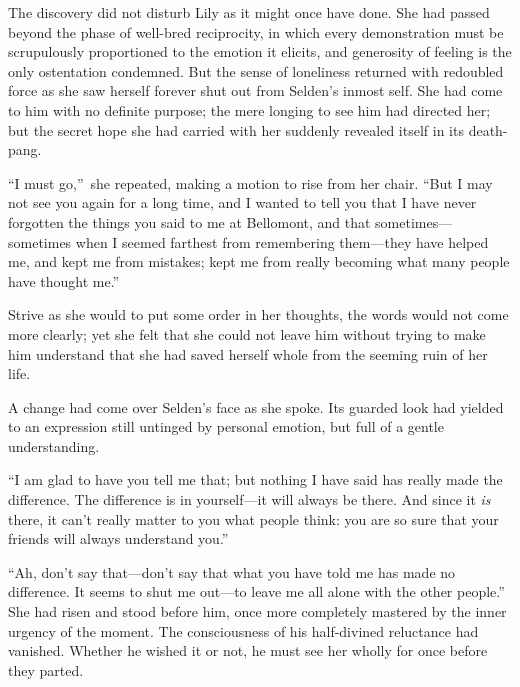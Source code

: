 \documentclass[12pt,a4paper]{book}
\begin{document}
The discovery did not disturb Lily as it might once have done. 
She had passed beyond the phase of well-bred reciprocity, in
which every demonstration must be scrupulously proportioned to
the emotion it elicits, and generosity of feeling is the only
ostentation condemned. But the sense of loneliness returned with
redoubled force as she saw herself forever shut out from Selden's
inmost self. She had come to him with no definite purpose; the
mere longing to see him had directed her; but the secret hope she
had carried with her suddenly revealed itself in its death-pang.





``I must go,''\ she repeated, making a motion to rise from her
chair. ``But I may not see you again for a long time, and I wanted
to tell you that I have never forgotten the things you said to me
at Bellomont, and that sometimes---sometimes when I seemed
farthest from remembering them---they have helped me, and kept me
from mistakes; kept me from really becoming what many people have
thought me.''





Strive as she would to put some order in her thoughts, the words
would not come more clearly; yet she felt that she could not
leave him without trying to make him understand that she had
saved herself whole from the seeming ruin of her life.





A change had come over Selden's face as she spoke. Its guarded
look had yielded to an expression still untinged by personal
emotion, but full of a gentle understanding.





``I am glad to have you tell me that; but nothing I have said has
really made the difference. The difference is in yourself---it
will always be there. And since it \textit{is} there, it can't really
matter to you what people think: you are so sure that your
friends will always understand you.''





``Ah, don't say that---don't say that what you have told me has
made no difference. It seems to shut me out---to leave me all
alone with the other people.'' She had risen and stood before him,
once more completely mastered by the inner urgency of the moment. 
The consciousness of his half-divined reluctance had vanished. 
Whether he wished it or not, he must see her wholly for once
before they parted.
\end{document}
